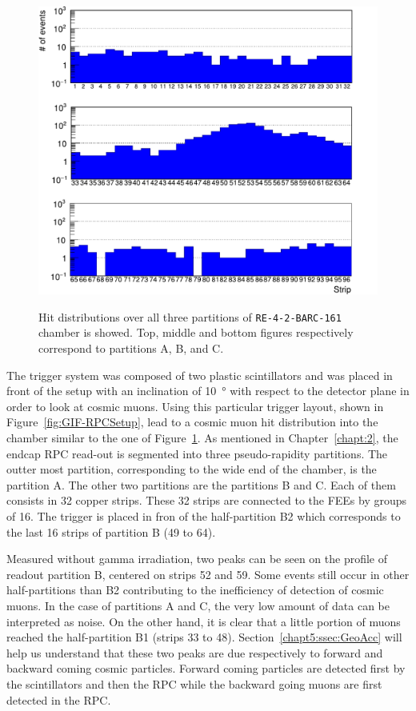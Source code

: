	\begin{figure}
		\centering
		\includegraphics[width = \linewidth]{fig/chapt5/Data-21-profile.pdf}\\
		\caption{\label{fig:HitProf} Hit distributions over all three partitions of \texttt{RE-4-2-BARC-161} chamber is showed. Top, middle and bottom figures respectively correspond to partitions A, B, and C.}
	\end{figure}
	
	The trigger system was composed of two plastic scintillators and was placed in front of the setup with an inclination of \SI{10}{\degree} with respect to the detector plane in order to look at cosmic muons. Using this particular trigger layout, shown in Figure~\ref{fig:GIF-RPCSetup}, lead to a cosmic muon hit distribution into the chamber similar to the one of Figure~\ref{fig:HitProf}. As mentioned in Chapter~\ref{chapt:2}, the endcap RPC read-out is segmented into three pseudo-rapidity partitions. The outter most partition, corresponding to the wide end of the chamber, is the partition A. The other two partitions are the partitions B and C. Each of them consists in 32 copper strips. These 32 strips are connected to the FEEs by groups of 16. The trigger is placed in fron of the half-partition B2 which corresponds to the last 16 strips of partition B (49 to 64).
	
	Measured without gamma irradiation, two peaks can be seen on the profile of readout partition B, centered on strips 52 and 59. Some events still occur in other half-partitions than B2 contributing to the inefficiency of detection of cosmic muons. In the case of partitions A and C, the very low amount of data can be interpreted as noise. On the other hand, it is clear that a little portion of muons reached the half-partition B1 (strips 33 to 48). Section~\ref{chapt5:ssec:GeoAcc} will help us understand that these two peaks are due respectively to forward and backward coming cosmic particles. Forward coming particles are detected first by the scintillators and then the RPC while the backward going muons are first detected in the RPC.
	

